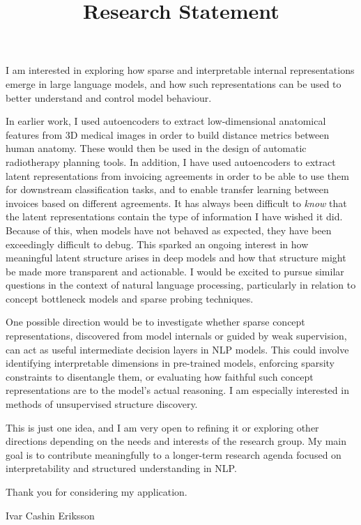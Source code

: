 \documentclass[11pt,a4paper]{moderncv}
\begin{document}
\recipient{}{}
\date{}
\title{Research Statement}
\makecvtitle
I am interested in exploring how sparse and interpretable internal representations emerge in large language models, and how such representations can be used to better understand and control model behaviour.

\hspace*{2em}
In earlier work, I used autoencoders to extract low-dimensional anatomical features from 3D medical images in order to build distance metrics between human anatomy. These would then be used in the design of automatic radiotherapy planning tools. In addition, I have used autoencoders to extract latent representations from invoicing agreements in order to be able to use them for downstream classification tasks, and to enable transfer learning between invoices based on different agreements. It has always been difficult to \textit{know} that the latent representations contain the type of information I have wished it did. Because of this, when models have not behaved as expected, they have been exceedingly difficult to debug. This sparked an ongoing interest in how meaningful latent structure arises in deep models and how that structure might be made more transparent and actionable. I would be excited to pursue similar questions in the context of natural language processing, particularly in relation to concept bottleneck models and sparse probing techniques.

\hspace*{2em}
One possible direction would be to investigate whether sparse concept representations, discovered from model internals or guided by weak supervision, can act as useful intermediate decision layers in NLP models. This could involve identifying interpretable dimensions in pre-trained models, enforcing sparsity constraints to disentangle them, or evaluating how faithful such concept representations are to the model's actual reasoning. I am especially interested in methods of unsupervised structure discovery.

\hspace*{2em}
This is just one idea, and I am very open to refining it or exploring other directions depending on the needs and interests of the research group. My main goal is to contribute meaningfully to a longer-term research agenda focused on interpretability and structured understanding in NLP.

\vspace{6mm}
Thank you for considering my application.

\vspace{3mm}
Ivar Cashin Eriksson
\end{document}
